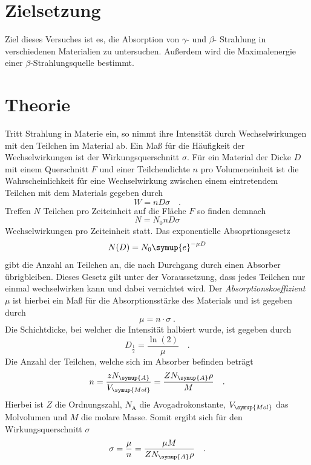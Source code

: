 


\maketitle    
\tableofcontents
\newpage
\section{Zielsetzung}
Ziel dieses Versuches ist es, die Absorption von $\gamma$- und $\beta$- Strahlung in verschiedenen Materialien zu untersuchen.
Außerdem wird die Maximalenergie einer $\beta$-Strahlungsquelle bestimmt.

\section{Theorie}
Tritt Strahlung in Materie ein, so nimmt ihre Intensität durch Wechselwirkungen mit den Teilchen im Material ab. Ein Maß für die Häufigkeit
der Wechselwirkungen ist der Wirkungsquerschnitt $\sigma$. Für ein Material der Dicke $D$ mit einem Querschnitt $F$ und einer Teilchendichte
$n$ pro Volumeneinheit ist die Wahrscheinlichkeit für eine Wechselwirkung zwischen einem eintretendem Teilchen mit dem Materials gegeben
durch 
\begin{equation}
W=nD\sigma \quad .
\end{equation}
Treffen $N$ Teilchen pro Zeiteinheit auf die Fläche $F$ so finden demnach
\begin{equation}
N=N_0nD\sigma
\end{equation}
Wechselwirkungen pro Zeiteinheit statt.
Das exponentielle Absoprtionsgesetz
\begin{equation}
N(D)=N_0 \symup{e}^{-\mu D}
\end{equation}
gibt die Anzahl an Teilchen an, die nach Durchgang durch einen Absorber übrigbleiben. Dieses Gesetz gilt unter der Voraussetzung, dass
jedes Teilchen nur einmal wechselwirken kann und dabei vernichtet wird. Der \textit{Absorptionskoeffizient} $\mu$ ist hierbei ein Maß für die Absorptionsstärke
des Materials und ist gegeben durch
\begin{equation}
    \mu =n \cdot \sigma\;.
\end{equation}
Die Schichtdicke, bei welcher die Intensität halbiert wurde, ist gegeben durch
\begin{equation}
D_{\frac{1}{2}}=\frac{\ln(2)}{\mu}\quad .
\end{equation}
Die Anzahl der Teilchen, welche sich im Absorber befinden beträgt
\begin{equation}
n=\frac{z N_{\symup{A}}}{V_{\symup{Mol}}}=\frac{Z N_{\symup{A}}\rho}{M}\quad .
\end{equation}
Hierbei ist $Z$ die Ordnungszahl, $N_{\text{A}}$ die Avogadrokonstante, $V_{\symup{Mol}}$ das Molvolumen und $M$ die molare Masse.
Somit ergibt sich für den Wirkungsquerschnitt $\sigma$
\begin{equation}
\sigma=\frac{\mu}{n}=\frac{\mu M}{Z N_{\symup{A}}\rho} \quad .
\end{equation}

